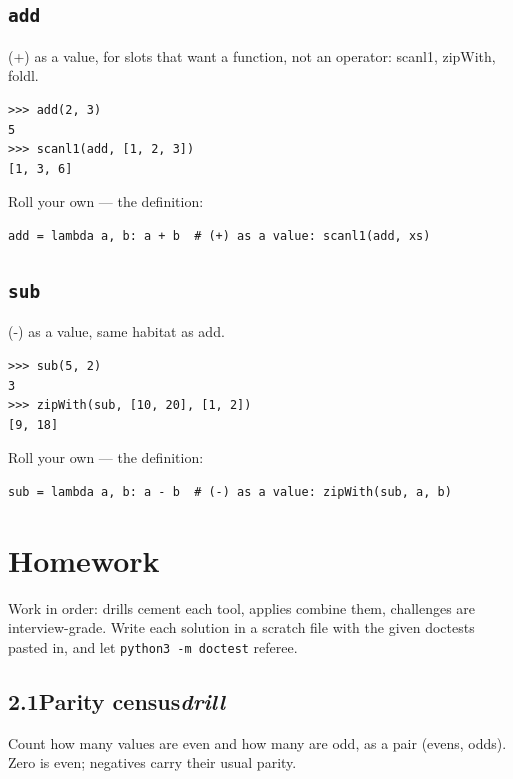 \documentclass[10pt,letterpaper]{book}
\begin{document}
\subsection{\texttt{add}}\label{def:add}
(+) as a value, for slots that want a function, not an operator: scanl1, zipWith, foldl.
\begin{lstlisting}[style=ex]
>>> add(2, 3)
5
>>> scanl1(add, [1, 2, 3])
[1, 3, 6]
\end{lstlisting}

Roll your own --- the definition:

\begin{lstlisting}[style=ex]
add = lambda a, b: a + b  # (+) as a value: scanl1(add, xs)
\end{lstlisting}

\subsection{\texttt{sub}}\label{def:sub}
(-) as a value, same habitat as add.
\begin{lstlisting}[style=ex]
>>> sub(5, 2)
3
>>> zipWith(sub, [10, 20], [1, 2])
[9, 18]
\end{lstlisting}

Roll your own --- the definition:

\begin{lstlisting}[style=ex]
sub = lambda a, b: a - b  # (-) as a value: zipWith(sub, a, b)
\end{lstlisting}

\section{Homework}
Work in order: drills cement each tool, applies combine them,
challenges are interview-grade. Write each solution in a scratch file with
the given doctests pasted in, and let \texttt{python3 -m doctest} referee.
\subsection*{2.1\quad Parity census\hfill\textnormal{\textit{drill}}}
Count how many values are even and how many are odd, as a pair (evens, odds). Zero is even; negatives carry their usual parity.
\end{document}
